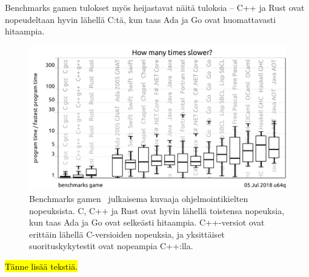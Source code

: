 \FloatBarrier

Benchmarks gamen tulokset myös heijastavat näitä tuloksia -- C++ ja Rust ovat
nopeudeltaan hyvin lähellä C:tä, kun taas Ada ja Go ovat huomattavasti
hitaampia.

\FloatBarrier

\begin{figure}[ht!]
    \includegraphics[width=\textwidth]{benchmarksgame.png}
    \caption{
        Benchmarks gamen~\citep{benchmarks} julkaisema kuvaaja
        ohjelmointikielten nopeuksista. C, C++ ja Rust ovat hyvin lähellä
        toistensa nopeuksia, kun taas Ada ja Go ovat selkeästi hitaampia.
        C++-versiot ovat erittäin lähellä C-versioiden nopeuksia, ja
        yksittäiset suorituskykytestit ovat nopeampia C++:lla.
    }
    \label{fig:benchmarksgame}
\end{figure}

\FloatBarrier

\hl{Tänne lisää tekstiä.}
